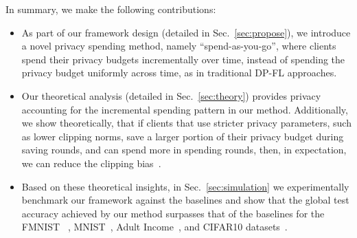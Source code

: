 In summary, we make the following contributions:
\begin{itemize}
\item %
{As part of our framework design (detailed in Sec.~\ref{sec:propose}), we introduce a novel privacy spending method, namely ``spend-as-you-go'', where clients spend their privacy budgets incrementally over time, instead of spending the privacy budget uniformly across time, as in traditional DP-FL approaches.} 

\item %
{Our theoretical analysis (detailed in Sec.~\ref{sec:theory}) provides privacy accounting for the incremental spending pattern in our method.
Additionally, we show theoretically, that if clients that use stricter privacy parameters, such as lower clipping norms, save a larger portion of their privacy budget during saving rounds, and can spend more in spending rounds, then, in expectation, we can reduce the clipping bias~\citep{das2023beyond}.}

\item Based on these theoretical insights, in Sec.~\ref{sec:simulation} we experimentally benchmark our framework against the baselines and show that the global test accuracy achieved by our method surpasses that of the baselines for the FMNIST ~\citep{xiao2017fashion}, MNIST~\citep{deng2012mnist}, Adult Income~\citep{adult_2}, %
{and CIFAR10 datasets~\citep{krizhevsky2009learning}}. 

\end{itemize}

